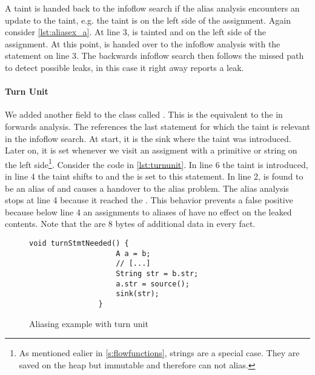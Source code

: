 \documentclass[../draft.tex]{subfiles}
\begin{document}
    A taint is handed back to the infoflow search if the alias analysis encounters an update to the taint, e.g. the taint is on the left side of the assignment. Again consider \autoref{lst:aliasex_a}. At line 3,  is tainted and on the left side of the assignment. At this point,  is handed over to the infoflow analysis with the statement on line 3. The backwards infoflow search then follows the missed path to detect possible leaks, in this case it right away reports a leak.

    \paragraph{Turn Unit} 
    We added another field to the  class called . This is the equivalent to the  in forwards analysis. The  references the last statement for which the taint is relevant in the infoflow search. At start, it is the sink where the taint was introduced. Later on, it is set whenever we visit an assigment with a primitive or string on the left side\footnote{As mentioned ealier in \autoref{s:flowfunctions}, strings are a special case. They are saved on the heap but immutable and therefore can not alias.}. Consider the code in \autoref{lst:turnunit}. In line 6 the taint is introduced, in line 4 the taint shifts to  and the  is set to this statement. In line 2,  is found to be an alias of  and causes a handover to the alias problem. The alias analysis stops at line 4 because it reached the . This behavior prevents a false positive because below line 4 an assignments to aliases of  have no effect on the leaked contents. Note that the  are 8 bytes of additional data in every fact.

    \begin{figure}[ht]
        \centering
        \begin{adjustbox}{max width=\columnwidth}
            \begin{lstlisting}[gobble=16]
                void turnStmtNeeded() {
                    A a = b;
                    // [...]
                    String str = b.str;
                    a.str = source();
                    sink(str);
                }
            \end{lstlisting}
        \end{adjustbox}
        \caption{Aliasing example with turn unit}
        \label{lst:turnunit}
    \end{figure}
\end{document}
